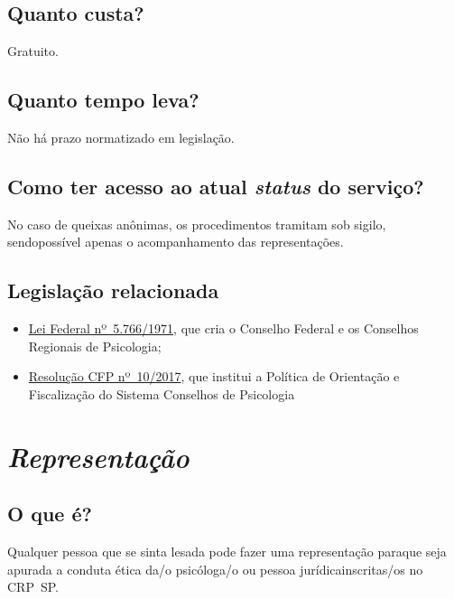 \section{Quanto custa?}

Gratuito.

\section{Quanto tempo leva?}

Não há prazo normatizado em legislação.

\section{Como ter acesso ao atual \emph{status} do serviço?}

No caso de queixas anônimas, os procedimentos tramitam sob sigilo, sendopossível apenas o acompanhamento das representações.

\section{Legislação relacionada}

\begin{itemize}
  \item  \href{http://www.planalto.gov.br/ccivil_03/leis/l5766.htm}{Lei Federal  nº~5.766/1971}, que cria o Conselho Federal e os Conselhos Regionais  de Psicologia;
  \item  \href{https://transparencia.cfp.org.br/wp-content/uploads/sites/10/2017/07/Resolu\%C3\%A7\%C3\%A3o-CFP-010-2017-Politica-de-Orienta\%C3\%A7\%C3\%A3o-e-Fiscaliza\%C3\%A7\%C3\%A3o-dos-Conselhos.pdf}{Resolução  CFP nº~10/2017}, que institui a Política de Orientação e Fiscalização  do Sistema Conselhos de Psicologia
\end{itemize}

\chapter{\texorpdfstring{\emph{Representação}}{Representação}}


\section{O que é?}

Qualquer pessoa que se sinta lesada pode fazer uma representação paraque seja apurada a conduta ética da/o psicóloga/o ou pessoa jurídicainscritas/os no CRP~SP.

